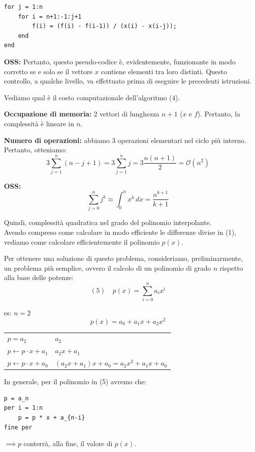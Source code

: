 \begin{verbatim}
for j = 1:n
    for i = n+1:-1:j+1
        f(i) = (f(i) - f(i-1)) / (x(i) - x(i-j));
    end
end
\end{verbatim}

\textbf{OSS:} Pertanto, questo pseudo-codice è, evidentemente, funzionante in modo corretto se e solo se il vettore $x$ contiene elementi tra loro distinti. Questo controllo, a qualche livello, va effettuato prima di eseguire le precedenti istruzioni.

Vediamo qual è il costo computazionale dell'algoritmo (4).

\textbf{Occupazione di memoria:} 2 vettori di lunghezza $n+1$ ($x$ e $f$). Pertanto, la complessità è lineare in $n$.

\textbf{Numero di operazioni:} abbiamo 3 operazioni elementari nel ciclo più interno. Pertanto, otteniamo:
$$3 \sum_{j=1}^{n} (n - j + 1) = 3 \sum_{j=1}^{n} j = 3 \frac{n(n+1)}{2} = \mathcal{O}(n^2)$$

\textbf{OSS:} 
$$\sum_{j=0}^{n} j^k \approx \int_{0}^{n} x^k \, dx = \frac{n^{k+1}}{k+1}$$

Quindi, complessità quadratica nel grado del polinomio interpolante.\\

Avendo compreso come calcolare in modo efficiente le differenze divise in (1), vediamo come calcolare efficientemente il polinomio $p(x)$.

Per ottenere una soluzione di questo problema, consideriamo, preliminarmente, un problema più semplice, ovvero il calcolo di un polinomio di grado $n$ rispetto alla base delle potenze:
$$(5) \quad p(x) = \sum_{i=0}^{n} a_i x^i$$

es: $n=2$
$$p(x) = a_0 + a_1 x + a_2 x^2$$

\begin{center}
\renewcommand{\arraystretch}{1.5}
\begin{tabular}{l|l}
$p = a_2$ & $a_2$ \\
$p \leftarrow p \cdot x + a_1$ & $a_2 x + a_1$ \\
$p \leftarrow p \cdot x + a_0$ & $(a_2 x + a_1)x + a_0 = a_2 x^2 + a_1 x + a_0$
\end{tabular}
\end{center}

In generale, per il polinomio in (5) avremo che:
\begin{verbatim}
p = a_n
per i = 1:n
    p = p * x + a_{n-i}
fine per
\end{verbatim}
$\implies p$ conterrà, alla fine, il valore di $p(x)$.

